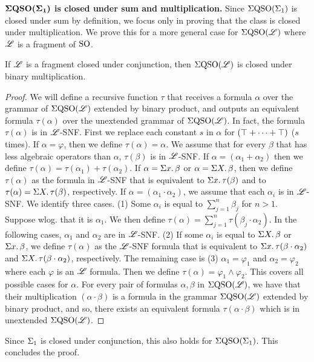 \vspace{1em}
$\boldsymbol{\Sigma{\rm QSO}(\Sigma_{1})}$ {\bf is closed under sum and multiplication.} Since $\Sigma{\rm QSO}(\Sigma_{1})$ is closed under sum by definition, we focus only in proving that the class is closed under multiplication. We prove this for a more general case for $\Sigma{\rm QSO}(\mathscr{L})$ where $\mathscr{L}$ is a fragment of ${\rm SO}$.

\begin{lemma} \label{conj-mult}
	If $\mathscr{L}$ is a fragment closed under conjunction, then $\Sigma{\rm QSO}(\mathscr{L})$ is closed under binary multiplication.
\end{lemma}
\begin{proof}
	We will define a recursive function $\tau$ that receives a formula $\alpha$ over the grammar of $\Sigma{\rm QSO}(\mathscr{L})$ extended by binary product, and outputs an equivalent formula $\tau(\alpha)$ over the unextended grammar of $\Sigma{\rm QSO}(\mathscr{L})$. In fact, the formula $\tau(\alpha)$ is in $\mathscr{L}$-SNF. First we replace each constant $s$ in $\alpha$ for $(\top + \cdots + \top)$ ($s$ times). If $\alpha = \varphi$, then we define $\tau(\alpha) = \alpha$. We assume that for every $\beta$ that has less algebraic operators than $\alpha$, $\tau(\beta)$ is in $\mathscr{L}$-SNF. If $\alpha = (\alpha_1 + \alpha_2)$ then we define $\tau(\alpha) = \tau(\alpha_1) + \tau(\alpha_2)$. If $\alpha = \Sigma{x}.\,\beta$ or $\alpha = \Sigma{X}.\,\beta$, then we define $\tau(\alpha)$ as the formula in $\mathscr{L}$-SNF that is equivalent to $\Sigma{x}.\,\tau(\beta)$ and to $\tau(\alpha) = \Sigma{X}.\,\tau(\beta)$, respectively. If $\alpha = (\alpha_1 \cdot \alpha_2)$, we assume that each $\alpha_i$ is in $\mathscr{L}$-SNF. We identify three cases. (1) Some $\alpha_i$ is equal to $\sum_{j = 1}^n\beta_j$ for $n > 1$. Suppose wlog. that it is $\alpha_1$. We then define $\tau(\alpha) = \sum_{j = 1}^n\tau(\beta_j\cdot\alpha_2)$. In the following cases, $\alpha_1$ and $\alpha_2$ are in $\mathscr{L}$-SNF. (2) If some $\alpha_i$ is equal to $\Sigma{X}.\,\beta$ or $\Sigma{x}.\,\beta$, we define $\tau(\alpha)$ as the $\mathscr{L}$-SNF formula that is equivalent to $\Sigma{x}.\,\tau(\beta\cdot\alpha_2)$ and $\Sigma{X}.\,\tau(\beta\cdot\alpha_2)$, respectively. The remaining case is (3) $\alpha_1 = \varphi_1$ and $\alpha_2 = \varphi_2$ where each $\varphi$ is an $\mathscr{L}$ formula. Then we define $\tau(\alpha) = \varphi_1 \wedge \varphi_2$. This covers all possible cases for $\alpha$. For every pair of formulas $\alpha,\beta$ in $\Sigma{\rm QSO}(\mathscr{L})$, we have that their multiplication $(\alpha\cdot\beta)$ is a formula in the grammar $\Sigma{\rm QSO}(\mathscr{L})$ extended by binary product, and so, there exists an equivalent formula $\tau(\alpha\cdot\beta)$ which is in unextended $\Sigma{\rm QSO}(\mathscr{L})$.
\end{proof}
Since $\Sigma_{1}$ is closed under conjunction, this also holds for $\Sigma{\rm QSO}(\Sigma_{1})$. This concludes the proof.